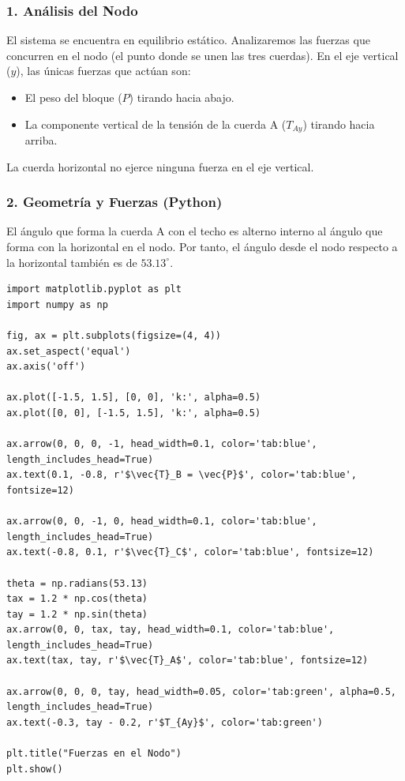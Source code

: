 \documentclass[12pt, a4paper]{article}
\begin{document}
\subsubsection*{1. Análisis del Nodo}
El sistema se encuentra en equilibrio estático. Analizaremos las fuerzas que concurren en el nodo (el punto donde se unen las tres cuerdas). 
En el eje vertical ($y$), las únicas fuerzas que actúan son:
\begin{itemize}
    \item El peso del bloque ($P$) tirando hacia abajo.
    \item La componente vertical de la tensión de la cuerda A ($T_{Ay}$) tirando hacia arriba.
\end{itemize}
La cuerda horizontal no ejerce ninguna fuerza en el eje vertical.

\subsubsection*{2. Geometría y Fuerzas (Python)}
El ángulo que forma la cuerda A con el techo es alterno interno al ángulo que forma con la horizontal en el nodo. Por tanto, el ángulo desde el nodo respecto a la horizontal también es de $53.13^\circ$.

\begin{lstlisting}
import matplotlib.pyplot as plt
import numpy as np

fig, ax = plt.subplots(figsize=(4, 4))
ax.set_aspect('equal')
ax.axis('off')

ax.plot([-1.5, 1.5], [0, 0], 'k:', alpha=0.5)
ax.plot([0, 0], [-1.5, 1.5], 'k:', alpha=0.5)

ax.arrow(0, 0, 0, -1, head_width=0.1, color='tab:blue', length_includes_head=True)
ax.text(0.1, -0.8, r'$\vec{T}_B = \vec{P}$', color='tab:blue', fontsize=12)

ax.arrow(0, 0, -1, 0, head_width=0.1, color='tab:blue', length_includes_head=True)
ax.text(-0.8, 0.1, r'$\vec{T}_C$', color='tab:blue', fontsize=12)

theta = np.radians(53.13)
tax = 1.2 * np.cos(theta)
tay = 1.2 * np.sin(theta)
ax.arrow(0, 0, tax, tay, head_width=0.1, color='tab:blue', length_includes_head=True)
ax.text(tax, tay, r'$\vec{T}_A$', color='tab:blue', fontsize=12)

ax.arrow(0, 0, 0, tay, head_width=0.05, color='tab:green', alpha=0.5, length_includes_head=True)
ax.text(-0.3, tay - 0.2, r'$T_{Ay}$', color='tab:green')

plt.title("Fuerzas en el Nodo")
plt.show()
\end{lstlisting}
\end{document}

